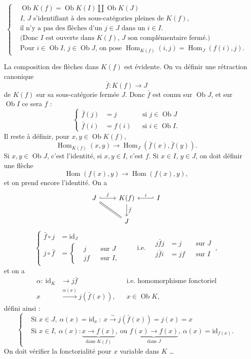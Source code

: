 \documentclass[11pt]{article}
\newcommand{\printedpage}[1]{\marginpar{\footnotesize p.~#1}}
\newcommand{\msp}[1]{\marginpar{\footnotesize [#1]}}
\newcommand{\Hom}{\operatorname{Hom}}
\newcommand{\Ob}{\operatorname{Ob}}
\newcommand{\id}{\mathrm{id}}
\begin{document}
\[
\left\{
\begin{aligned}
&\Ob K(f) = \Ob K(I) \amalg \Ob K(J) \qquad \\
&\text{$I$, $J$ s'identifiant à des sous-catégories pleines de $K(f)$,}\\
&\text{il n'y a pas des flèches d'un $j \in J$ dans un $i \in I$.}\\
&\text{(Donc $I$ est ouverte dans $K(f)$, $J$ son complémentaire fermé.)}\\
&\text{Pour $i \in \Ob I$, $j \in \Ob J$, on pose $\Hom_{K(f)}(i,j) = \Hom_J(f(i),j)$.}
\end{aligned}
\right.
\]

La composition des flèches dans $K(f)$ est évidente. On va définir une rétraction canonique
\[ \bar{f} : K(f) \longrightarrow J \]
de $K(f)$ sur sa sous-catégorie fermée $J$. Donc $\bar{f}$ est connu sur $\Ob J$, et sur $\Ob I$ ce sera $f$ :
\[
\left\{
\begin{aligned}
\bar{f}(j) &= j && \text{si } j \in \Ob J\\
\bar{f}(i) &= f(i) && \text{si } i \in \Ob I.
\end{aligned}
\right.
\]
Il reste à définir, pour $x, y \in \Ob K(f)$,
\msp{page 80}
\[ \Hom_{K(f)}(x,y) \longrightarrow \Hom_J(\bar{f}(x), \bar{f}(y)). \]
Si $x, y \in \Ob J$, c'est l'identité, si $x, y \in I$, c'est $f$. Si $x \in I$, $y \in J$, on doit définir une flèche
\[ \Hom(f(x),y) \longrightarrow \Hom(f(x),y), \]
et on prend encore l'identité. On a
\[
\begin{tikzcd}
J \arrow[r, hook, "j"] \arrow[dr, equal] & K(f) \arrow[d, "\bar{f}"] & I \arrow[l, hook', "i"'] \\
& J &
\end{tikzcd}
\]
\[
\left\{
\begin{aligned}
\bar{f} \circ j &= \id_J\\
j \circ \bar{f} &= \left\{
\begin{aligned}
&j && \text{sur } J\\
&jf && \text{sur } I,
\end{aligned}
\right.
\end{aligned}
\right.
\qquad \text{i.e.} \quad
\boxed{
\begin{aligned}
j\bar{f}j &= j && \text{sur } J\\
j\bar{f}i &= jf && \text{sur } I
\end{aligned}
}\ ,
\]
et on a
\[
\begin{aligned}
\alpha :\ \id_K &\longrightarrow j\bar{f} && \text{i.e. homomorphisme fonctoriel}\\
x &\xrightarrow{\alpha(x)} j(\bar{f}(x)), && x \in \Ob K,
\end{aligned}
\]
\printedpage{6}
défini ainsi :
\[
\left\{
\begin{aligned}
&\text{Si } x \in J,\ \alpha(x) = \id_x\ :\ x \xrightarrow{\sim} j(\bar{f}(x)) = j(x) = x\\
&\text{Si } x \in I,\ \alpha(x) : \underbrace{x \longrightarrow f(x)}_{\text{dans } K(f)},\ \text{ou } \underbrace{f(x) \longrightarrow f(x)}_{\text{dans } J},\ \alpha(x) = \id_{f(x)}.
\end{aligned}
\right.
\]
On doit vérifier la fonctorialité pour $x$ variable dans $K$ \dots
\end{document}
